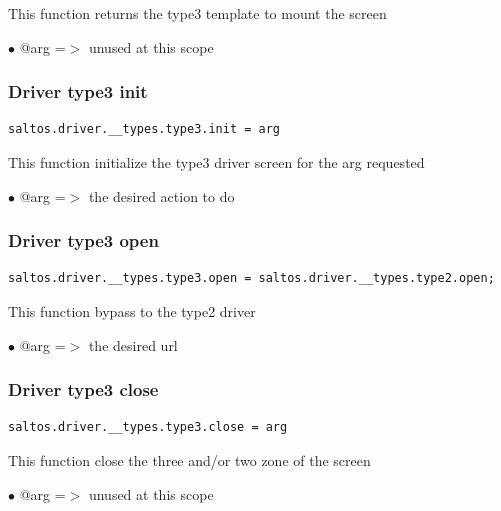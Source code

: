 \documentclass[a4paper]{article}
\begin{document}
This function returns the type3 template to mount the screen

\begin{compactitem}
\item[\color{myblue}$\bullet$] @arg =$>$ unused at this scope
\end{compactitem}

\hypertarget{toc194}{}
\subsubsection{Driver type3 init}

\begin{lstlisting}
saltos.driver.__types.type3.init = arg
\end{lstlisting}

This function initialize the type3 driver screen for the arg requested

\begin{compactitem}
\item[\color{myblue}$\bullet$] @arg =$>$ the desired action to do
\end{compactitem}

\hypertarget{toc195}{}
\subsubsection{Driver type3 open}

\begin{lstlisting}
saltos.driver.__types.type3.open = saltos.driver.__types.type2.open;
\end{lstlisting}

This function bypass to the type2 driver

\begin{compactitem}
\item[\color{myblue}$\bullet$] @arg =$>$ the desired url
\end{compactitem}

\hypertarget{toc196}{}
\subsubsection{Driver type3 close}

\begin{lstlisting}
saltos.driver.__types.type3.close = arg
\end{lstlisting}

This function close the three and/or two zone of the screen

\begin{compactitem}
\item[\color{myblue}$\bullet$] @arg =$>$ unused at this scope
\end{compactitem}
\end{document}
